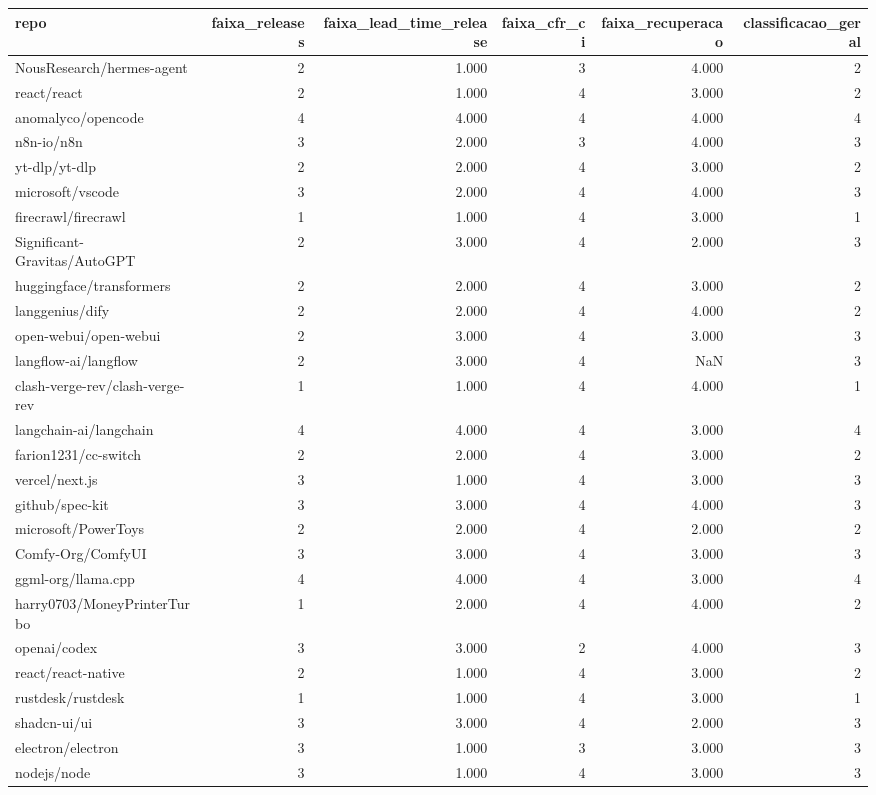 \begin{tabular}{lrrrrr}
\toprule
repo & faixa_releases & faixa_lead_time_release & faixa_cfr_ci & faixa_recuperacao & classificacao_geral \\
\midrule
NousResearch/hermes-agent & 2 & 1.000 & 3 & 4.000 & 2 \\
react/react & 2 & 1.000 & 4 & 3.000 & 2 \\
anomalyco/opencode & 4 & 4.000 & 4 & 4.000 & 4 \\
n8n-io/n8n & 3 & 2.000 & 3 & 4.000 & 3 \\
yt-dlp/yt-dlp & 2 & 2.000 & 4 & 3.000 & 2 \\
microsoft/vscode & 3 & 2.000 & 4 & 4.000 & 3 \\
firecrawl/firecrawl & 1 & 1.000 & 4 & 3.000 & 1 \\
Significant-Gravitas/AutoGPT & 2 & 3.000 & 4 & 2.000 & 3 \\
huggingface/transformers & 2 & 2.000 & 4 & 3.000 & 2 \\
langgenius/dify & 2 & 2.000 & 4 & 4.000 & 2 \\
open-webui/open-webui & 2 & 3.000 & 4 & 3.000 & 3 \\
langflow-ai/langflow & 2 & 3.000 & 4 & NaN & 3 \\
clash-verge-rev/clash-verge-rev & 1 & 1.000 & 4 & 4.000 & 1 \\
langchain-ai/langchain & 4 & 4.000 & 4 & 3.000 & 4 \\
farion1231/cc-switch & 2 & 2.000 & 4 & 3.000 & 2 \\
vercel/next.js & 3 & 1.000 & 4 & 3.000 & 3 \\
github/spec-kit & 3 & 3.000 & 4 & 4.000 & 3 \\
microsoft/PowerToys & 2 & 2.000 & 4 & 2.000 & 2 \\
Comfy-Org/ComfyUI & 3 & 3.000 & 4 & 3.000 & 3 \\
ggml-org/llama.cpp & 4 & 4.000 & 4 & 3.000 & 4 \\
harry0703/MoneyPrinterTurbo & 1 & 2.000 & 4 & 4.000 & 2 \\
openai/codex & 3 & 3.000 & 2 & 4.000 & 3 \\
react/react-native & 2 & 1.000 & 4 & 3.000 & 2 \\
rustdesk/rustdesk & 1 & 1.000 & 4 & 3.000 & 1 \\
shadcn-ui/ui & 3 & 3.000 & 4 & 2.000 & 3 \\
electron/electron & 3 & 1.000 & 3 & 3.000 & 3 \\
nodejs/node & 3 & 1.000 & 4 & 3.000 & 3 \\

\end{tabular}
